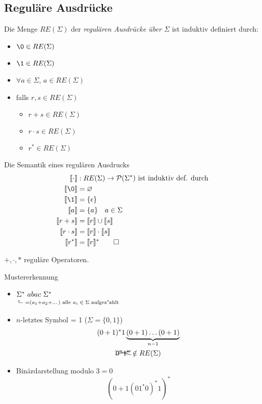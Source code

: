 \subsection{Reguläre Ausdrücke}
\begin{Def}[name={[RE($\Sigma$)]}]
	Die Menge $RE(\Sigma)$ der \emph{regulären Ausdrücke über $\Sigma$} ist induktiv definiert durch:
	\begin{itemize}
	\item $\0\in RE(\Sigma)$
	\item $\1\in RE(\Sigma)$
	\item $\forall a\in\Sigma$, $a\in RE(\Sigma)$
	\item falls $r,s\in RE(\Sigma)$
		\begin{itemize}[label=\textbullet]
		\item $r+s\in RE(\Sigma)$
		\item $r\cdot s\in RE(\Sigma)$
		\item $r^*\in RE(\Sigma)$
		\end{itemize}
	\end{itemize}
\end{Def}
\begin{Def}[name={[Semantik eines regulären Ausdrucks]}]
	Die Semantik eines regulären Ausdrucks
	\begin{align*}
		\llbracket\cdot \rrbracket &: RE(\Sigma) \-> \mathcal{P}(\Sigma^*)\text{ ist induktiv def. durch}\\
		\llbracket \0 \rrbracket &= \varnothing\\
		\llbracket \1 \rrbracket &= \{\epsilon\}\\
		\llbracket a \rrbracket &= \{a\} \quad a\in\Sigma\\
		\llbracket r+s \rrbracket &= \llbracket r\rrbracket \cup \llbracket s\rrbracket\\
		\llbracket r\cdot s \rrbracket &= \llbracket r\rrbracket \cdot \llbracket s\rrbracket\\
		\llbracket r^* \rrbracket &= \llbracket r\rrbracket^* \qedhere
	\end{align*}
\end{Def}
$+,\cdot ,*$ reguläre Operatoren.\\
%
\begin{minipage}[t]{.5\textwidth}
    \begin{Bsp*} Mustererkennung
    	\begin{itemize}
    	\item $\underset{\vphantom{\big(}\mathrlap{\hspace{-4pt}\rotatebox[origin=c]{90}{$\Rsh$}\ =(a_1+a_2+\dots) \text{ alle $a_i\in\Sigma$ aufgez"ahlt}}}{\Sigma^*}\ abac\ \Sigma^*$
    	\item $n$-letztes Symbol = 1 ($\Sigma=\{0,1\}$)
    	\begin{gather*}
    	(0+1)^*1\underbrace{(0+1)\dots(0+1)}_{n-1}\\
    	\xcancel{0^n1^n}\notin RE(\Sigma)
    	\end{gather*}
    	\item Binärdarstellung modulo $3=0$
    	\[ (0+1(01^*0)^*1)^* \]
    	\end{itemize}
    \end{Bsp*}
\end{minipage}%
